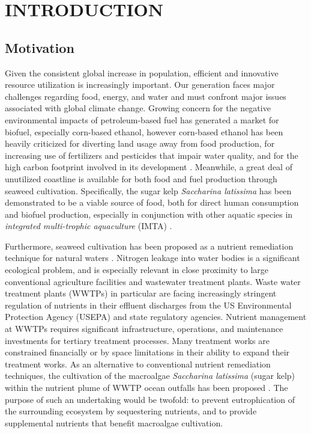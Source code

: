 \chapter{INTRODUCTION} \label{ch:intro}

\section{Motivation}
  Given the consistent global increase in population, efficient and innovative resource utilization is increasingly important.
Our generation faces major challenges regarding food, energy, and water and must confront major issues associated with global climate change.
Growing concern for the negative environmental impacts of petroleum-based fuel has generated a market for biofuel, especially corn-based ethanol,
however corn-based ethanol has been heavily criticized for diverting land usage away from food production, for increasing use of fertilizers and pesticides that impair water quality, and for the high carbon footprint involved in its development \cite{jones_corn-based_nodate,searchinger_use_2008}.
Meanwhile, a great deal of unutilized coastline is available for both food and fuel production through seaweed cultivation.
Specifically, the sugar kelp \textit{Saccharina latissima} has been demonstrated to be a viable source of food, both for direct human consumption and biofuel production, especially in conjunction with other aquatic species in \textit{integrated multi-trophic aquaculture} (IMTA) \cite{brzeski_integrated_1996,chopin_integrating_2001,hadley_modeling_2015,handa_seasonal_2013}.

Furthermore, seaweed cultivation has been proposed as a nutrient remediation technique for natural waters \cite{kim_field_2014}.
Nitrogen leakage into water bodies is a significant ecological problem, and is especially relevant in close proximity to large conventional agriculture facilities and wastewater treatment plants.
Waste water treatment plants (WWTPs) in particular are facing increasingly stringent regulation of nutrients in their effluent discharges from the US Environmental Protection Agency (USEPA) and state regulatory agencies.
Nutrient management at WWTPs requires significant infrastructure, operations, and maintenance investments for tertiary treatment processes. Many treatment works are constrained financially or by space limitations in their ability to expand their treatment works.
As an alternative to conventional nutrient remediation techniques, the cultivation of the macroalgae \textit{Saccharina latissima} (sugar kelp) within the nutrient plume of WWTP ocean outfalls has been proposed \cite{yang_kelp_2015}.
The purpose of such an undertaking would be twofold: to prevent eutrophication of the surrounding ecosystem by sequestering nutrients, and to provide supplemental nutrients that benefit macroalgae cultivation.

